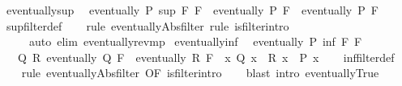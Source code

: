 \begin{isabellebody}
%
\isadelimproof
\isanewline
%
\endisadelimproof
\isanewline
{}\isamarkupfalse%
\ eventually{\isacharunderscore}{\kern0pt}sup{\isacharcolon}{\kern0pt}\isanewline
\ \ {\isachardoublequoteopen}eventually\ P\ {\isacharparenleft}{\kern0pt}sup\ F\ F{\isacharprime}{\kern0pt}{\isacharparenright}{\kern0pt}\ {\isasymlongleftrightarrow}\ eventually\ P\ F\ {\isasymand}\ eventually\ P\ F{\isacharprime}{\kern0pt}{\isachardoublequoteclose}\isanewline
%
\isadelimproof
\ \ %
\endisadelimproof
%
\isatagproof
{}\isamarkupfalse%
\ sup{\isacharunderscore}{\kern0pt}filter{\isacharunderscore}{\kern0pt}def\isanewline
\ \ \isamarkupfalse%
\ {\isacharparenleft}{\kern0pt}rule\ eventually{\isacharunderscore}{\kern0pt}Abs{\isacharunderscore}{\kern0pt}filter{\isacharcomma}{\kern0pt}\ rule\ is{\isacharunderscore}{\kern0pt}filter{\isachardot}{\kern0pt}intro{\isacharparenright}{\kern0pt}\isanewline
\ \ \ \ \ {\isacharparenleft}{\kern0pt}auto\ elim{\isacharbang}{\kern0pt}{\isacharcolon}{\kern0pt}\ eventually{\isacharunderscore}{\kern0pt}rev{\isacharunderscore}{\kern0pt}mp{\isacharparenright}{\kern0pt}%
\endisatagproof
{\isafoldproof}%
%
\isadelimproof
\isanewline
%
\endisadelimproof
\isanewline
{}\isamarkupfalse%
\ eventually{\isacharunderscore}{\kern0pt}inf{\isacharcolon}{\kern0pt}\isanewline
\ \ {\isachardoublequoteopen}eventually\ P\ {\isacharparenleft}{\kern0pt}inf\ F\ F{\isacharprime}{\kern0pt}{\isacharparenright}{\kern0pt}\ {\isasymlongleftrightarrow}\isanewline
\ \ \ {\isacharparenleft}{\kern0pt}{\isasymexists}Q\ R{\isachardot}{\kern0pt}\ eventually\ Q\ F\ {\isasymand}\ eventually\ R\ F{\isacharprime}{\kern0pt}\ {\isasymand}\ {\isacharparenleft}{\kern0pt}{\isasymforall}x{\isachardot}{\kern0pt}\ Q\ x\ {\isasymand}\ R\ x\ {\isasymlongrightarrow}\ P\ x{\isacharparenright}{\kern0pt}{\isacharparenright}{\kern0pt}{\isachardoublequoteclose}\isanewline
%
\isadelimproof
\ \ %
\endisadelimproof
%
\isatagproof
{}\isamarkupfalse%
\ inf{\isacharunderscore}{\kern0pt}filter{\isacharunderscore}{\kern0pt}def\isanewline
\ \ \isamarkupfalse%
\ {\isacharparenleft}{\kern0pt}rule\ eventually{\isacharunderscore}{\kern0pt}Abs{\isacharunderscore}{\kern0pt}filter\ {\isacharbrackleft}{\kern0pt}OF\ is{\isacharunderscore}{\kern0pt}filter{\isachardot}{\kern0pt}intro{\isacharbrackright}{\kern0pt}{\isacharparenright}{\kern0pt}\isanewline
\ \ \isamarkupfalse%
\ {\isacharparenleft}{\kern0pt}blast\ intro{\isacharcolon}{\kern0pt}\ eventually{\isacharunderscore}{\kern0pt}True{\isacharparenright}{\kern0pt}\isanewline

\end{isabellebody}
